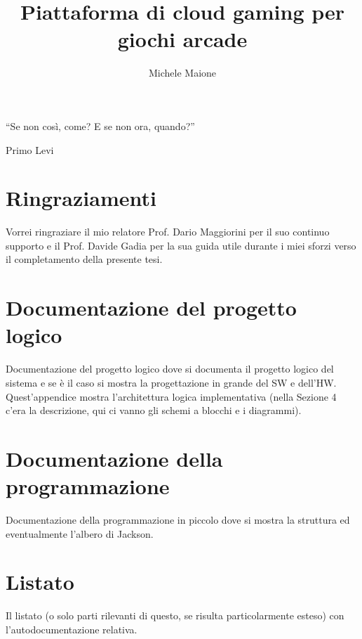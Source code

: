 \documentclass[openany]{book}
\title{Piattaforma di cloud gaming per giochi arcade}
\author{Michele Maione}
\newcounter{savepage}
\begin{document}


\frontmatter
{
\raggedleft \large %
	``Se non così, come? E se non ora, quando?''
	
	\bigskip
	
	\textemdash Primo Levi\\
}

\chapter*{Ringraziamenti}
Vorrei ringraziare il mio relatore Prof. Dario Maggiorini per il suo continuo supporto e il Prof. Davide Gadia per la sua guida utile durante i miei sforzi verso il completamento della presente tesi.



\newpage
\setcounter{tocdepth}{2}
\tableofcontents



\newpage
{}

\mainmatter






\appendix
\newpage
{}
\setcounter{page}{\thesavepage}

\chapter{Documentazione del progetto logico}
Documentazione del progetto logico dove si documenta il progetto logico del sistema e se è il caso si mostra la progettazione in grande del SW e dell’HW. Quest’appendice mostra l’architettura logica implementativa (nella Sezione 4 c’era la descrizione, qui ci vanno gli schemi a blocchi e i diagrammi).

\chapter{Documentazione della programmazione}
Documentazione della programmazione in piccolo dove si mostra la struttura ed eventualmente l’albero di Jackson.

\chapter{Listato}
Il listato (o solo parti rilevanti di questo, se risulta particolarmente esteso) con l’autodocumentazione relativa.
\end{document}

